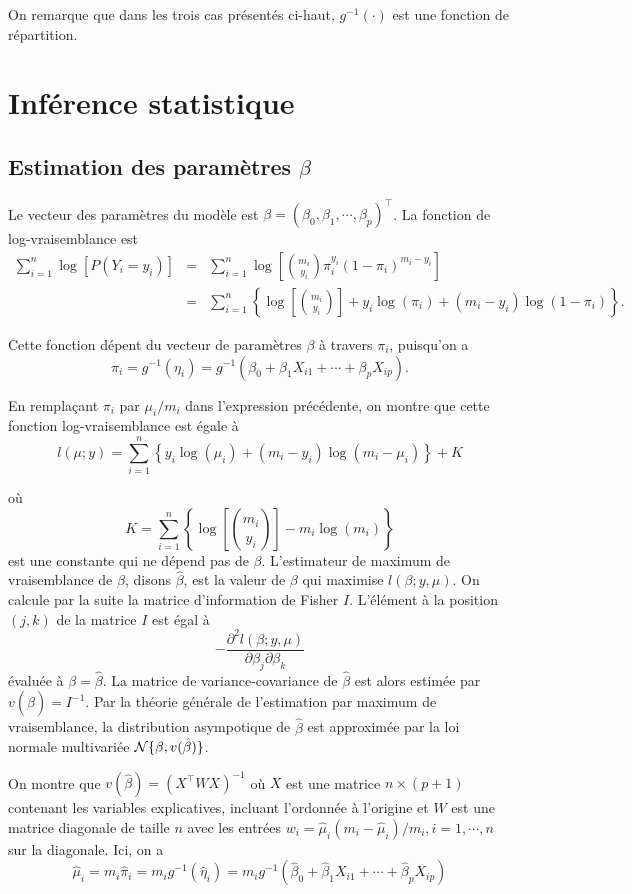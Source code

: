 \documentclass[11pt]{article}
\begin{document}
\noindent On remarque que dans les trois cas présentés ci-haut, $g^{-1}(\cdot)$ est une fonction de répartition. 


\section{Inférence statistique}

\subsection{Estimation des paramètres $\beta$}
Le vecteur des paramètres du modèle est $\beta=(\beta_0,\beta_1,\cdots,\beta_p)^\top$. La fonction de log-vraisemblance est
\begin{eqnarray*}
\sum_{i=1}^n \log\left[P(Y_i=y_i)\right]&=&\sum_{i=1}^n \log\left[\binom{m_i}{y_i} \pi_i^{y_i}(1-\pi_i)^{m_i-y_i}\right] \\ 
&=& \sum_{i=1}^n \left\{\log\left[\binom{m_i}{y_i}\right]+y_i\log(\pi_i)+(m_i-y_i)\log(1-\pi_i)\right\}.
\end{eqnarray*}

\noindent Cette fonction dépent du vecteur de paramètres $\beta$ \`a travers $\pi_i$, puisqu'on a 
$$\pi_i = g^{-1}(\eta_i) = g^{-1}(\beta_0+\beta_1 X_{i1} + \cdots + \beta_p X_{ip}).$$

\noindent En rempla\c{c}ant $\pi_i$ par $\mu_i/m_i$ dans l'expression précédente, on montre que cette fonction log-vraisemblance est égale \`a
$$l(\mu;y) = \sum_{i=1}^n \left\{y_i \log(\mu_i) + (m_i-y_i) \log(m_i-\mu_i)\right\} + K$$

\noindent où $$K = \sum_{i=1}^n \left\{\log\left[\binom{m_i}{y_i}\right] - m_i\log(m_i)\right\}$$
est une constante qui ne dépend pas de $\beta$. L'estimateur de maximum de vraisemblance de $\beta$, disons $\hat\beta$, est la valeur de $\beta$ qui maximise $l(\beta;y,\mu)$. On calcule par la suite la matrice d'information de Fisher $I$. L'élément \`a la position $(j,k)$ de la matrice $I$ est égal \`a 
$$-\frac{\partial^2 l(\beta;y,\mu)}{\partial \beta_j \partial \beta_k}$$
évaluée \`a $\beta=\hat\beta$. La matrice de variance-covariance de $\hat\beta$ est alors estimée par $v(\hat\beta)=I^{-1}$. Par la théorie générale de l'estimation par maximum de vraisemblance, la distribution asympotique de $\hat\beta$ est approximée par la loi normale multivariée ${\cal N}\{\beta,v(\hat\beta)\}$.

\noindent On montre que $v(\hat\beta) = (X^\top W X)^{-1}$ où $X$ est une matrice $n \times (p+1)$ contenant les variables explicatives, incluant l'ordonnée à l'origine et $W$ est une matrice diagonale de taille $n$ avec les entrées $w_{i}=\hat\mu_i(m_i-\hat\mu_i)/m_i, i=1,\cdots,n$ sur la diagonale. Ici, on a
$$\hat\mu_i  = m_i \hat \pi_i = m_i g^{-1}(\hat\eta_i) = m_i g^{-1}(\hat\beta_0+\hat\beta_1 X_{i1} + \cdots + \hat\beta_p X_{ip})$$
\end{document}
